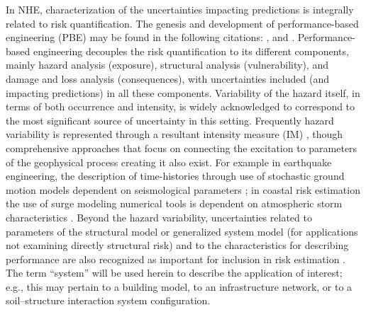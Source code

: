 In NHE, characterization of the uncertainties impacting predictions is integrally related to risk quantification. The genesis and development of performance-based engineering (PBE) may be found in the following citations: \citep{whittaker2003performancebased, goulet2007evaluation, riggs2008experimental, ciampoli2011performancebased,  barbato2013performancebased}, and \citep{fischer2019performancebased}. Performance-based engineering decouples the risk quantification to its different components, mainly hazard analysis (exposure), structural analysis (vulnerability), and damage and loss analysis (consequences), with uncertainties included (and impacting predictions) in all these components. Variability of the hazard itself, in terms of both occurrence and intensity, is widely acknowledged to correspond to the most significant source of uncertainty in this setting. Frequently hazard variability is represented through a resultant intensity measure (IM) \citep{baker2005vectorvalued,kohrangi2016implications}, though comprehensive approaches that focus on connecting the excitation to parameters of the geophysical process creating it also exist. For example in earthquake engineering, the description of time-histories through use of stochastic ground motion models dependent on seismological parameters \citep{bijelic2018validation, vlachos2018predictive}; in coastal risk estimation the use of surge modeling numerical tools is dependent on atmospheric storm characteristics \citep{resio2007white}. Beyond the hazard variability, uncertainties related to parameters of the structural model or generalized system model (for applications not examining directly structural risk) and to the characteristics for describing performance are also recognized as important for inclusion in risk estimation \citep{porter2002sensitivity}. The term ``system'' will be used herein to describe the application of interest; e.g., this may pertain to a building model, to an infrastructure network, or to a soil--structure interaction system configuration. 

